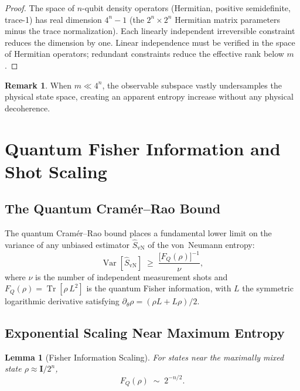 \documentclass[12pt,letterpaper]{article}
\theoremstyle{plain}
\newtheorem{lemma}[theorem]{Lemma}
\theoremstyle{definition}
\newtheorem{remark}[theorem]{Remark}
\newcommand{\tr}{\operatorname{Tr}}
\newcommand{\FQ}{F_{Q}}
\newcommand{\hSvN}{\hat{S}_{\mathrm{vN}}}
\begin{document}
\begin{proof}
The space of $n$-qubit density operators (Hermitian, positive semidefinite, trace-1) has
real dimension $4^{n}-1$ (the $2^{n}\times 2^{n}$ Hermitian matrix parameters minus the
trace normalization).  Each linearly independent irreversible constraint reduces the dimension
by one.  Linear independence must be verified in the space of Hermitian operators; redundant
constraints reduce the effective rank below $m$.
\end{proof}

\begin{remark}
When $m \ll 4^{n}$, the observable subspace vastly undersamples the physical state space,
creating an apparent entropy increase without any physical decoherence.
\end{remark}

\section{Quantum Fisher Information and Shot Scaling}
\label{sec:qfi}

\subsection{The Quantum Cram\'{e}r--Rao Bound}

The quantum Cram\'{e}r--Rao bound places a fundamental lower limit on the variance of any
unbiased estimator $\hSvN$ of the von~Neumann entropy:
\begin{equation}
  \operatorname{Var}[\hSvN]
  \;\geq\;
  \frac{\bigl[\FQ(\rho)\bigr]^{-1}}{\nu},
  \label{eq:cramer-rao}
\end{equation}
where $\nu$ is the number of independent measurement shots and
$\FQ(\rho) = \tr[\rho\,L^{2}]$ is the quantum Fisher information, with $L$ the symmetric
logarithmic derivative satisfying $\partial_{\theta}\rho = (\rho L + L\rho)/2$.

\subsection{Exponential Scaling Near Maximum Entropy}

\begin{lemma}[Fisher Information Scaling]
\label{lem:fisher}
For states near the maximally mixed state $\rho \approx \mathbf{I}/2^{n}$,
\begin{equation}
  \FQ(\rho) \;\sim\; 2^{-n/2}.
  \label{eq:fisher-scaling}
\end{equation}
\end{lemma}
\end{document}
